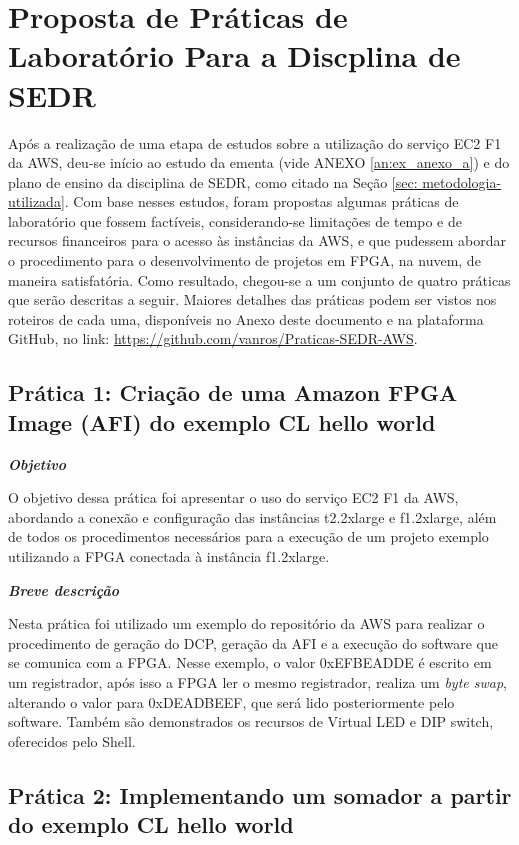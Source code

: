\section{Proposta de Práticas de Laboratório Para a Discplina de SEDR}

Após a realização de uma etapa de estudos sobre a utilização do serviço EC2 F1 da AWS, deu-se início ao estudo da ementa (vide ANEXO \ref{an:ex_anexo_a}) e do plano de ensino  da disciplina de SEDR, como citado na Seção \ref{sec: metodologia-utilizada}. Com base nesses estudos, foram propostas algumas práticas de laboratório que fossem factíveis, considerando-se limitações de tempo e de recursos financeiros para o acesso às instâncias da AWS, e que pudessem abordar o procedimento para o desenvolvimento de projetos em FPGA, na nuvem, de maneira satisfatória. Como resultado, chegou-se a um conjunto de quatro práticas que serão descritas a seguir. Maiores detalhes das práticas podem ser vistos nos roteiros de cada uma, disponíveis no Anexo deste documento e na plataforma GitHub, no link: \url{https://github.com/vanros/Praticas-SEDR-AWS}.

\subsection{Prática 1: Criação de uma Amazon FPGA Image (AFI) do exemplo CL hello world}

\noindent\textbf{\textit{Objetivo}}

O objetivo dessa prática foi apresentar o uso do serviço EC2 F1 da AWS, abordando a conexão e configuração das instâncias t2.2xlarge e f1.2xlarge, além de todos os procedimentos necessários para a execução de um projeto exemplo utilizando a FPGA conectada à instância f1.2xlarge.


\noindent\textbf{\textit{Breve descrição}}

Nesta prática foi utilizado um exemplo do repositório da AWS para realizar o procedimento de geração do DCP,  geração da AFI e a execução do software que se comunica com a FPGA. Nesse exemplo, o valor 0xEFBEADDE é escrito em um registrador, após isso a FPGA ler o mesmo registrador, realiza um \textit{byte swap}, alterando o valor para 0xDEADBEEF, que será lido posteriormente pelo software. Também são demonstrados os recursos de Virtual LED e DIP switch, oferecidos pelo Shell.

\subsection{Prática 2: Implementando um somador a partir do exemplo CL hello world}

